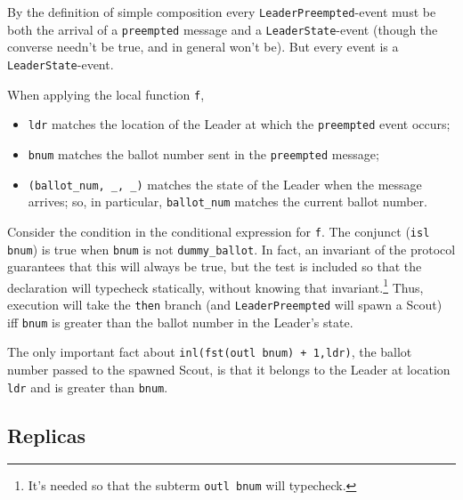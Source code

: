 \documentclass[final]{article}
\begin{document}
By the definition of simple composition every
\lstinline{LeaderPreempted}-event must be both the arrival of a
\lstinline{preempted} message and a \lstinline{LeaderState}-event
(though the converse needn't be true, and in general won't be).  But
every event is a \lstinline{LeaderState}-event.

When applying the local function \lstinline{f},
\begin{itemize}
\item
\lstinline{ldr} matches the location of the Leader at which the
\lstinline{preempted} event occurs;

\item
\lstinline{bnum} matches the ballot number sent in the
\lstinline{preempted} message;

\item
\lstinline{(ballot_num, _, _)} matches the state of the Leader
when the message arrives; so, in particular,
\lstinline{ballot_num} matches the current ballot number.
\end{itemize}
Consider the condition in the conditional expression for
\lstinline{f}.  The conjunct (\lstinline{isl bnum}) is true when
\lstinline{bnum} is not \lstinline{dummy_ballot}.  In fact, an
invariant of the protocol guarantees that this will always be true,
but the test is included so that the declaration will typecheck
statically, without knowing that invariant.\footnote{It's needed so
  that the subterm \lstinline{outl bnum} will typecheck.}  Thus,
execution will take the \lstinline{then} branch (and
\lstinline{LeaderPreempted} will spawn a Scout) iff \lstinline{bnum}
is greater than the ballot number in the Leader's state.

The only important fact about \lstinline{inl(fst(outl bnum) + 1,ldr)},
the ballot number passed to the spawned Scout, is that it belongs to
the Leader at location \lstinline{ldr} and is greater than
\lstinline{bnum}.

\subsection{Replicas}\label{sec:Replicas}
\end{document}
